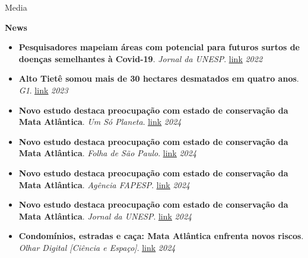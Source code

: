 \documentclass{resume}
\begin{document}

\begin{rSection}{Media}

\textbf{News}
\begin{itemize} 
\item \textbf{Pesquisadores mapeiam áreas com potencial para futuros surtos de doenças semelhantes à Covid-19}. \textit{Jornal da UNESP}. \href{https://jornal.unesp.br/2022/06/23/pesquisadores-mapeiam-areas-com-potencial-para-futuros-surtos-de-doencas-semelhantes-a-covid-19/}{\underline{link}} \hfill{\em 2022}
\item \textbf{Alto Tietê somou mais de 30 hectares desmatados em quatro anos}. \textit{G1}. \href{https://g1.globo.com/sp/mogi-das-cruzes-suzano/noticia/2023/06/05/em-quatro-anos-alto-tiete-somou-mais-de-30-hectares-desmatados.ghtml}{\underline{link}} \hfill{\em 2023}
\item \textbf{Novo estudo destaca preocupação com estado de conservação da Mata Atlântica}. \textit{Um Só Planeta}. \href{https://umsoplaneta.globo.com/biodiversidade/noticia/2024/06/24/novo-estudo-destaca-preocupacao-com-estado-de-conservacao-da-mata-atlantica.ghtml?utm_campaign=na_midia__n_23_junho_2024&utm_medium=email&utm_source=RD+Station}{\underline{link}} \hfill{\em 2024}
\item \textbf{Novo estudo destaca preocupação com estado de conservação da Mata Atlântica}. \textit{Folha de São Paulo}. \href{https://www1.folha.uol.com.br/folha-social-mais/2024/06/novo-estudo-destaca-preocupacao-com-estado-de-conservacao-da-mata-atlantica.shtml?utm_campaign=na_midia__n_23_junho_2024&utm_medium=email&utm_source=RD+Station}{\underline{link}} \hfill{\em 2024}
\item \textbf{Novo estudo destaca preocupação com estado de conservação da Mata Atlântica}. \textit{Agência FAPESP}. \href{https://agencia.fapesp.br/novo-estudo-destaca-preocupacao-com-estado-de-conservacao-da-mata-atlantica/52013}{\underline{link}} \hfill{\em 2024}
\item \textbf{Novo estudo destaca preocupação com estado de conservação da Mata Atlântica}. \textit{Jornal da UNESP}. \href{https://jornal.unesp.br/2024/03/15/novo-estudo-destaca-preocupacao-com-estado-de-conservacao-da-mata-atlantica/}{\underline{link}} \hfill{\em 2024}
\item \textbf{Condomínios, estradas e caça: Mata Atlântica enfrenta novos riscos}. \textit{Olhar Digital [Ciência e Espaço]}. \href{https://olhardigital.com.br/2024/06/25/ciencia-e-espaco/condominios-estradas-e-caca-mata-atlantica-enfrenta-novos-riscos/}{\underline{link}} \hfill{\em 2024}

\end{itemize}
\end{rSection}
\end{document}
